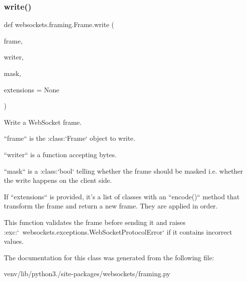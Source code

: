 \subsubsection{\texorpdfstring{write()}{write()}}
{\footnotesize\ttfamily def websockets.\+framing.\+Frame.\+write (\begin{DoxyParamCaption}\item[{}]{frame,  }\item[{}]{writer,  }\item[{}]{mask,  }\item[{}]{extensions = {\ttfamily None} }\end{DoxyParamCaption})}

\begin{DoxyVerb}Write a WebSocket frame.

``frame`` is the :class:`Frame` object to write.

``writer`` is a function accepting bytes.

``mask`` is a :class:`bool` telling whether the frame should be masked
i.e. whether the write happens on the client side.

If ``extensions`` is provided, it's a list of classes with an
``encode()`` method that transform the frame and return a new frame.
They are applied in order.

This function validates the frame before sending it and raises
:exc:`~websockets.exceptions.WebSocketProtocolError` if it contains
incorrect values.\end{DoxyVerb}
 

The documentation for this class was generated from the following file\+:\begin{DoxyCompactItemize}
\item 
venv/lib/python3./site-\/packages/websockets/framing.\+py\end{DoxyCompactItemize}

